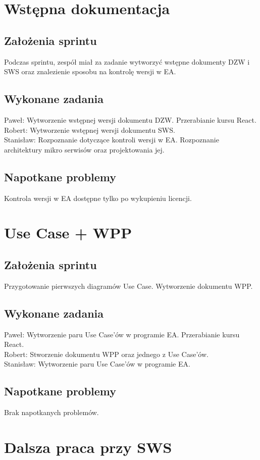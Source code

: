 \documentclass[a4paper,11pt]{report}
\begin{document}
\section {Wstępna dokumentacja}
\subsection {Założenia sprintu}
Podczas sprintu, zespół miał za zadanie wytworzyć wstępne dokumenty DZW i SWS oraz znalezienie sposobu na kontrolę wersji w EA.
\subsection {Wykonane zadania}
Paweł: Wytworzenie wstępnej wersji dokumentu DZW. Przerabianie kursu React.\\
Robert: Wytworzenie wstępnej wersji dokumentu SWS.\\
Stanisław: Rozpoznanie dotyczące kontroli wersji w EA. Rozpoznanie architektury mikro serwisów oraz projektowania jej.\\
\subsection {Napotkane problemy} 
Kontrola wersji w EA dostępne tylko po wykupieniu licencji.

\section {Use Case + WPP}
\subsection {Założenia sprintu}
Przygotowanie pierwszych diagramów Use Case. Wytworzenie dokumentu WPP.
\subsection {Wykonane zadania}
Paweł: Wytworzenie paru Use Case'ów w programie EA. Przerabianie kursu React.\\
Robert: Stworzenie dokumentu WPP oraz jednego z Use Case'ów.\\
Stanisław: Wytworzenie paru Use Case'ów w programie EA.\\
\subsection {Napotkane problemy}
Brak napotkanych problemów.

\section {Dalsza praca przy SWS}
\end{document}
